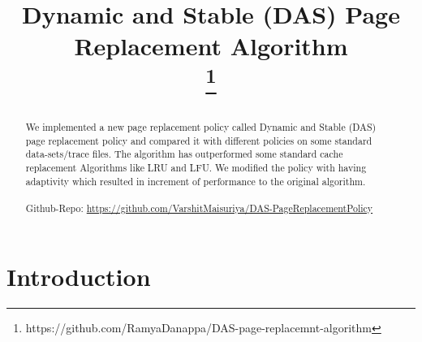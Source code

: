 \documentclass[conference]{IEEEtran}
\begin{document}
\title{Dynamic and Stable (DAS) Page Replacement Algorithm\\

\thanks{https://github.com/RamyaDanappa/DAS-page-replacemnt-algorithm}


}

\author{
\and
{}
\and
{}

}

\maketitle

\begin{abstract}
We implemented a new page replacement policy called Dynamic and Stable (DAS) page replacement policy and compared it with different policies on some standard data-sets/trace files. The algorithm has outperformed some standard cache replacement Algorithms like LRU and LFU. We modified the policy with having adaptivity which resulted in increment of performance to the original algorithm.\\
\\
Github-Repo:
\url{https://github.com/VarshitMaisuriya/DAS-PageReplacementPolicy}
\end{abstract}


\section{\textbf{Introduction}}
\end{document}
